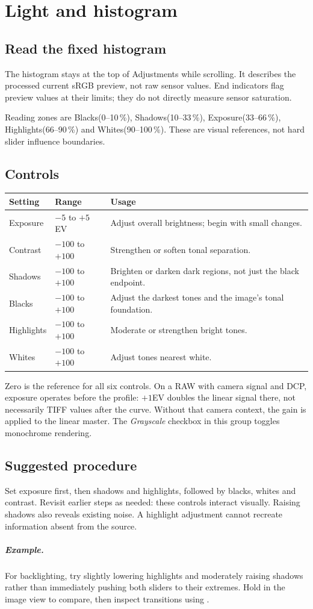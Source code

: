 \chapter{Light and histogram}
\section{Read the fixed histogram}
The histogram stays at the top of Adjustments while scrolling. It describes
the processed current sRGB preview, not raw sensor values. End indicators
flag preview values at their limits; they do not directly measure sensor
saturation.

Reading zones are Blacks(0--10\,\%), Shadows(10--33\,\%),
Exposure(33--66\,\%), Highlights(66--90\,\%) and Whites(90--100\,\%).
These are visual references, not hard slider influence boundaries.

\section{Controls}
\begin{longtable}{@{}L{3cm}L{2.8cm}L{7.8cm}@{}}
\toprule Setting & Range & Usage\\\midrule\endhead
Exposure & $-5$ to $+5$ EV & Adjust overall brightness; begin with small changes.\\
Contrast & $-100$ to $+100$ & Strengthen or soften tonal separation.\\
Shadows & $-100$ to $+100$ & Brighten or darken dark regions, not just the black endpoint.\\
Blacks & $-100$ to $+100$ & Adjust the darkest tones and the image's tonal foundation.\\
Highlights & $-100$ to $+100$ & Moderate or strengthen bright tones.\\
Whites & $-100$ to $+100$ & Adjust tones nearest white.\\
\bottomrule
\end{longtable}
Zero is the reference for all six controls. On a RAW with camera signal and
DCP, exposure operates before the profile: $+1$EV doubles the linear signal
there, not necessarily TIFF values after the curve. Without that camera
context, the gain is applied to the linear master. The \emph{Grayscale}
checkbox in this group toggles monochrome rendering.

\section{Suggested procedure}
Set exposure first, then shadows and highlights, followed by blacks, whites
and contrast. Revisit earlier steps as needed: these controls interact
visually. Raising shadows also reveals existing noise. A highlight adjustment
cannot recreate information absent from the source.

\paragraph{Example.}
For backlighting, try slightly lowering highlights and moderately raising
shadows rather than immediately pushing both sliders to their extremes.
Hold  in the image view to compare, then inspect transitions
using .
\gestesreglages
